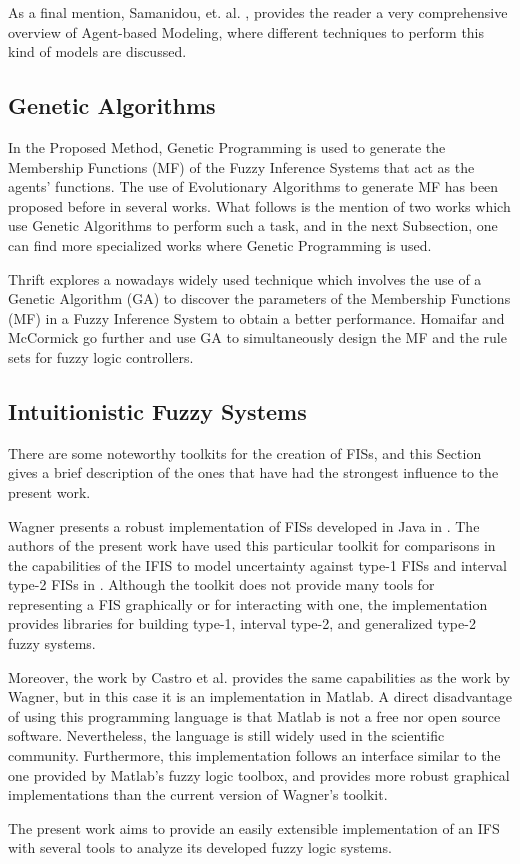 As a final mention, Samanidou, et. al. \cite{Samanidou_2007}, provides the reader a very comprehensive overview of Agent-based Modeling, where different techniques to perform this kind of models are discussed.

\subsection{Genetic Algorithms}
\label{genetic-algorithms}

In the Proposed Method, Genetic Programming is used to generate the Membership Functions (MF) of the Fuzzy Inference Systems that act as the agents' functions. The use of Evolutionary Algorithms to generate MF has been proposed before in several works. What follows is the mention of two works which use Genetic Algorithms to perform such a task, and in the next Subsection, one can find more specialized works where Genetic Programming is used.

Thrift \cite{Thrift1991} explores a nowadays widely used technique which involves the use of a Genetic Algorithm (GA) to discover the parameters of the Membership Functions (MF) in a Fuzzy Inference System to obtain a better performance. Homaifar and McCormick \cite{Homaifar1995} go further and use GA to simultaneously design the MF and the rule sets for fuzzy logic controllers.

\subsection{Intuitionistic Fuzzy Systems}
\label{subsection:related-work-intuitionistic-fuzzy-systems}

There are some noteworthy toolkits for the creation of FISs, and this Section gives a brief description of the ones that have had
the strongest influence to the present work.

Wagner presents a robust implementation of FISs developed in Java in \cite{Wagner2013}. The authors of the present work
have used this particular toolkit for comparisons in the capabilities of the IFIS to model uncertainty against type-1 FISs and interval
type-2 FISs in \cite{Hernandez-Aguila2016}. Although the toolkit does not provide many tools for representing a FIS graphically or for
interacting with one, the implementation provides libraries for building type-1, interval type-2, and generalized type-2 fuzzy systems.

Moreover, the work by Castro et al. \cite{castro2007interval} provides the same capabilities as the work by Wagner, but in this case 
it is an implementation in Matlab. A direct disadvantage of using this programming language is that Matlab is not
a free nor open source software.
Nevertheless, the language is still widely used in the scientific community. Furthermore, this implementation follows an interface 
similar to the one provided by Matlab's fuzzy logic toolbox, and provides more robust graphical implementations than the 
current version of Wagner's toolkit.

The present work aims to provide an easily extensible implementation of an IFS with several tools to analyze 
its developed fuzzy logic systems.